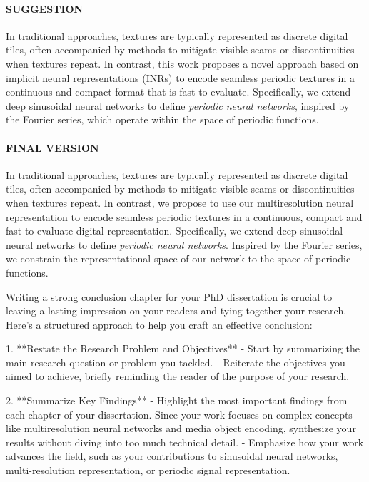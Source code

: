 \paragraph{SUGGESTION}
In traditional approaches, textures are typically represented as discrete digital tiles, often accompanied by methods to mitigate visible seams or discontinuities when textures repeat. In contrast, this work proposes a novel approach based on implicit neural representations (INRs) to encode seamless periodic textures in a continuous and compact format that is fast to evaluate. Specifically, we extend deep sinusoidal neural networks to define \textit{periodic neural networks}, inspired by the Fourier series, which operate within the space of periodic functions.

\paragraph{FINAL VERSION}
In traditional approaches, textures are typically represented as discrete digital tiles, often accompanied by methods to mitigate visible seams or discontinuities when textures repeat. In contrast, we propose to use our multiresolution neural representation to encode seamless periodic textures in a continuous, compact and fast to evaluate digital representation. Specifically, we extend deep sinusoidal neural networks to define \textit{periodic neural networks}. Inspired by the Fourier series, we constrain the representational space of our network to the space of periodic functions.



Writing a strong conclusion chapter for your PhD dissertation is crucial to leaving a lasting impression on your readers and tying together your research. Here’s a structured approach to help you craft an effective conclusion:

1. **Restate the Research Problem and Objectives**
   - Start by summarizing the main research question or problem you tackled.
   - Reiterate the objectives you aimed to achieve, briefly reminding the reader of the purpose of your research.

2. **Summarize Key Findings**
   - Highlight the most important findings from each chapter of your dissertation. Since your work focuses on complex concepts like multiresolution neural networks and media object encoding, synthesize your results without diving into too much technical detail.
   - Emphasize how your work advances the field, such as your contributions to sinusoidal neural networks, multi-resolution representation, or periodic signal representation.

